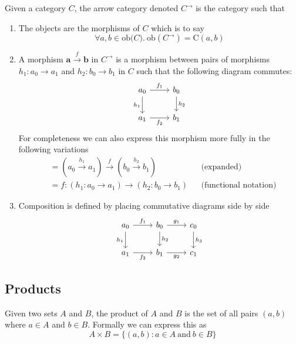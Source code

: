 \documentclass[10pt]{article}
\begin{document}
\begin{definition}
  Given a category $C$, the arrow category denoted $C ^\rightarrow$ is the category such that
  \begin{enumerate}
    \item The objects are the morphisms of $C$ which is to say
      \[
        \forall a, b\in \text{ob}\mathcal (C).\ \text{ob}(C ^\rightarrow) = \text{C}(a, b)
      \]
    \item A morphism $\mathbf a \xrightarrow f \mathbf b$ in $C ^\rightarrow$ is a morphism between pairs of morphisms $h_1 : a_0 \rightarrow a_1$ and $h_2 : b_0 \rightarrow b_1$ in $C$ such that the following diagram commutes:
      \[
        \begin{tikzcd}
          a_0 \arrow[r, "f_1"] \arrow[d, "h_1"'] & b_0 \arrow[d, "h_2"] \\
          a_1 \arrow[r, "f_2"'] & b_1
        \end{tikzcd}
      \]
      For completeness we can also express this morphism more fully in the following variations
      \[
        \begin{aligned}
          & = (a_0 \xrightarrow{h_1} a_1) \xrightarrow{f} (b_0 \xrightarrow{h_2} b_1) && \text{(expanded)} \\
          & = f : ( h_1 : a_0 \rightarrow a_1 ) \rightarrow ( h_2 : b_0 \rightarrow b_1 ) && \text{(functional notation)}
        \end{aligned}
      \]
    \item Composition is defined by placing commutative diagrams side by side
      \[
        \begin{tikzcd}
          a_0 \arrow[r, "f_1"] \arrow[d, "h_1"'] & b_0 \arrow[d, "h_2"] \arrow[r, "g_1"] & c_0 \arrow[d, "h_3"] \\
          a_1 \arrow[r, "f_2"'] & b_1 \arrow[r, "g_2"'] & c_1
        \end{tikzcd}
      \]
  \end{enumerate}
\end{definition}

\subsection{Products}

\begin{definition}
  Given two sets $A$ and $B$, the product of $A$ and $B$ is the set of all pairs $(a, b)$ where $a \in A$ and $b \in B$. Formally we can express this as
  \[
    A \times B = \{(a, b) : a \in A\ \text{and}\ b \in B\}
  \]
\end{definition}
\end{document}
